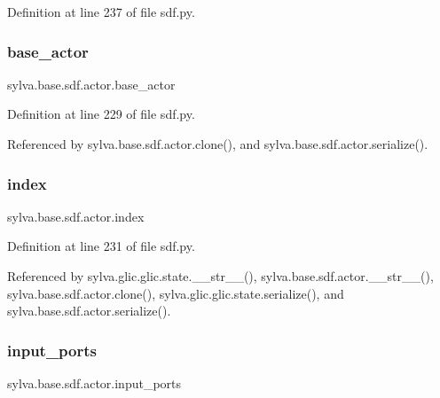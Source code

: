Definition at line 237 of file sdf.\+py.

\mbox{\label{classsylva_1_1base_1_1sdf_1_1actor_ae9b1e79fcf5e63107ae89ba68ecc4743}} 
\subsubsection{\texorpdfstring{base\+\_\+actor}{base\_actor}}
{\footnotesize\ttfamily sylva.\+base.\+sdf.\+actor.\+base\+\_\+actor}



Definition at line 229 of file sdf.\+py.



Referenced by sylva.\+base.\+sdf.\+actor.\+clone(), and sylva.\+base.\+sdf.\+actor.\+serialize().

\mbox{\label{classsylva_1_1base_1_1sdf_1_1actor_a876d41fa48c3a1a6d62fc3054b321f08}} 
\subsubsection{\texorpdfstring{index}{index}}
{\footnotesize\ttfamily sylva.\+base.\+sdf.\+actor.\+index}



Definition at line 231 of file sdf.\+py.



Referenced by sylva.\+glic.\+glic.\+state.\+\_\+\+\_\+str\+\_\+\+\_\+(), sylva.\+base.\+sdf.\+actor.\+\_\+\+\_\+str\+\_\+\+\_\+(), sylva.\+base.\+sdf.\+actor.\+clone(), sylva.\+glic.\+glic.\+state.\+serialize(), and sylva.\+base.\+sdf.\+actor.\+serialize().

\mbox{\label{classsylva_1_1base_1_1sdf_1_1actor_aad8739c0c518eb7017949d07effee1b2}} 
\subsubsection{\texorpdfstring{input\+\_\+ports}{input\_ports}}
{\footnotesize\ttfamily sylva.\+base.\+sdf.\+actor.\+input\+\_\+ports}



